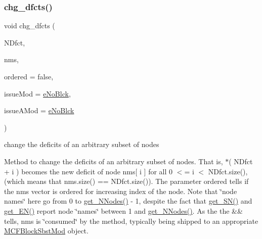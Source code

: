 \subsubsection{\texorpdfstring{chg\+\_\+dfcts()}{chg\_dfcts()}\hspace{0.1cm}{\footnotesize\ttfamily [2/2]}}
{\footnotesize\ttfamily void chg\+\_\+dfcts (\begin{DoxyParamCaption}\item[{\mbox{\hyperlink{class_s_m_spp__di__unipi__it_1_1_m_c_f_block_a2871db0555b42b11ad5315c7f631473b}{c\+\_\+\+Vec\+\_\+\+F\+Number\+\_\+it}}}]{N\+Dfct,  }\item[{\mbox{\hyperlink{class_s_m_spp__di__unipi__it_1_1_m_c_f_block_a9a1284953e2aa5222b5867c0a7f98499}{Vec\+\_\+\+Index}} \&\&}]{nms,  }\item[{const bool}]{ordered = {\ttfamily false},  }\item[{\mbox{\hyperlink{group___modification___t_y_p_e_s_ga544246d8c462e9a2d817c2c30797968f}{c\+\_\+\+Mod\+Param}}}]{issue\+Mod = {\ttfamily \mbox{\hyperlink{group___modification___t_y_p_e_s_gga48fddcdd03a03f49b7e389ca1ed938d4ada69e89c5f46e563d8a13cfa6830c136}{e\+No\+Blck}}},  }\item[{\mbox{\hyperlink{group___modification___t_y_p_e_s_ga544246d8c462e9a2d817c2c30797968f}{c\+\_\+\+Mod\+Param}}}]{issue\+A\+Mod = {\ttfamily \mbox{\hyperlink{group___modification___t_y_p_e_s_gga48fddcdd03a03f49b7e389ca1ed938d4ada69e89c5f46e563d8a13cfa6830c136}{e\+No\+Blck}}} }\end{DoxyParamCaption})}



change the deficits of an arbitrary subset of nodes 

Method to change the deficits of an arbitrary subset of nodes. That is, $\ast$( N\+Dfct + i ) becomes the new deficit of node nms\mbox{[} i \mbox{]} for all 0 $<$= i $<$ N\+Dfct.\+size(), (which means that nms.\+size() == N\+Dfct.\+size()). The parameter ordered tells if the nms vector is ordered for increasing index of the node. Note that \char`\"{}node names\char`\"{} here go from 0 to \mbox{\hyperlink{class_s_m_spp__di__unipi__it_1_1_m_c_f_block_afff9080606a5612d33ba20c39d663839}{get\+\_\+\+N\+Nodes()}} -\/ 1, despite the fact that \mbox{\hyperlink{class_s_m_spp__di__unipi__it_1_1_m_c_f_block_a48ce277b5dac05d54aa2281fa4595c7b}{get\+\_\+\+S\+N()}} and \mbox{\hyperlink{class_s_m_spp__di__unipi__it_1_1_m_c_f_block_a34619412f7c801aadfa0b083a6efda36}{get\+\_\+\+E\+N()}} report node \char`\"{}names\char`\"{} between 1 and \mbox{\hyperlink{class_s_m_spp__di__unipi__it_1_1_m_c_f_block_afff9080606a5612d33ba20c39d663839}{get\+\_\+\+N\+Nodes()}}. As the the \&\& tells, nms is \char`\"{}consumed\char`\"{} by the method, typically being shipped to an appropriate \mbox{\hyperlink{class_s_m_spp__di__unipi__it_1_1_m_c_f_block_sbst_mod}{M\+C\+F\+Block\+Sbst\+Mod}} object.

